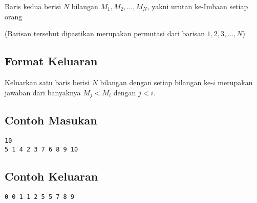 \documentclass{article}
\begin{document}
Baris kedua berisi $N$ bilangan $M_1, M_2, ..., M_N$, yakni urutan ke-Imbaan setiap orang

(Barisan tersebut dipastikan merupakan permutasi dari barisan $1, 2, 3, ..., N$)

\subsection*{Format Keluaran}

Keluarkan satu baris berisi $N$ bilangan dengan setiap bilangan ke-$i$ merupakan jawaban dari banyaknya $M_j < M_i$ dengan $j < i$.

\begin{multicols}{2}
\subsection*{Contoh Masukan}
\begin{lstlisting}
10
5 1 4 2 3 7 6 8 9 10
\end{lstlisting}
\columnbreak
\subsection*{Contoh Keluaran}
\begin{lstlisting}
0 0 1 1 2 5 5 7 8 9
\end{lstlisting}
\vfill
\null
\end{multicols}


\pagebreak
\end{document}
